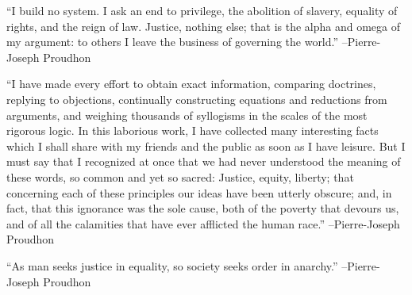 \documentclass{article}%
\begin{document}
\linebreak%
\vspace{1mm}%
\begin{minipage}{\textwidth}%
\flushleft%
“I build no system. I ask an end to privilege, the abolition of slavery, equality of rights, and the reign of law. Justice, nothing else; that is the alpha and omega of my argument: to others I leave the business of governing the world.”%
\linebreak%
\vspace{1mm}%
–Pierre{-}Joseph Proudhon%
\linebreak%
\vspace{1mm}%
\end{minipage}%
\linebreak%
\vspace{1mm}%
\begin{minipage}{\textwidth}%
\flushleft%
“I have made every effort to obtain exact information, comparing doctrines, replying to objections, continually constructing equations and reductions from arguments, and weighing thousands of syllogisms in the scales of the most rigorous logic. In this laborious work, I have collected many interesting facts which I shall share with my friends and the public as soon as I have leisure. But I must say that I recognized at once that we had never understood the meaning of these words, so common and yet so sacred: Justice, equity, liberty; that concerning each of these principles our ideas have been utterly obscure; and, in fact, that this ignorance was the sole cause, both of the poverty that devours us, and of all the calamities that have ever afflicted the human race.”%
\linebreak%
\vspace{1mm}%
–Pierre{-}Joseph Proudhon%
\linebreak%
\vspace{1mm}%
\end{minipage}%
\linebreak%
\vspace{1mm}%
\begin{minipage}{\textwidth}%
\flushleft%
“As man seeks justice in equality, so society seeks order in anarchy.”%
\linebreak%
\vspace{1mm}%
–Pierre{-}Joseph Proudhon%
\linebreak%
\vspace{1mm}%
\end{minipage}%
\linebreak%
\vspace{1mm}%
\end{document}
